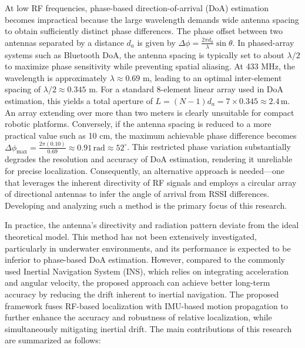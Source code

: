 \documentclass[subscriptcorrection,upint,varvw,barcolor=Goldenrod3,mathalfa=cal=euler,balance,hyphenate,pdf-a]{asmejour}
\begin{document}
At low RF frequencies, phase-based direction-of-arrival (DoA) estimation becomes impractical because the large wavelength demands wide antenna spacing to obtain sufficiently distinct phase differences. The phase offset between two antennas separated by a distance $d_a$ is given by $\Delta\phi = \frac{2\pi d_a}{\lambda} \sin\theta$. In phased-array systems such as Bluetooth DoA, the antenna spacing is typically set to about $\lambda/2$ to maximize phase sensitivity while preventing spatial aliasing. At 433 MHz, the wavelength is approximately $\lambda \approx 0.69$ m, leading to an optimal inter-element spacing of $\lambda/2 \approx 0.345$ m. For a standard 8-element linear array used in DoA estimation, this yields a total aperture of $L = (N-1)d_a = 7 \times 0.345 \approx 2.4\,\text{m}$. An array extending over more than two meters is clearly unsuitable for compact robotic platforms. Conversely, if the antenna spacing is reduced to a more practical value such as 10 cm, the maximum achievable phase difference becomes $\Delta\phi_{\max} = \frac{2\pi(0.10)}{0.69} \approx 0.91\,\text{rad} \approx 52^\circ$. This restricted phase variation substantially degrades the resolution and accuracy of DoA estimation, rendering it unreliable for precise localization. Consequently, an alternative approach is needed—one that leverages the inherent directivity of RF signals and employs a circular array of directional antennas to infer the angle of arrival from RSSI differences. Developing and analyzing such a method is the primary focus of this research.

In practice, the antenna’s directivity and radiation pattern deviate from the ideal theoretical model. This method has not been extensively investigated, particularly in underwater environments, and its performance is expected to be inferior to phase-based DoA estimation. However, compared to the commonly used Inertial Navigation System (INS), which relies on integrating acceleration and angular velocity, the proposed approach can achieve better long-term accuracy by reducing the drift inherent to inertial navigation. The proposed framework fuses RF-based localization with IMU-based motion propagation to further enhance the accuracy and robustness of relative localization, while simultaneously mitigating inertial drift. The main contributions of this research are summarized as follows:
\end{document}

